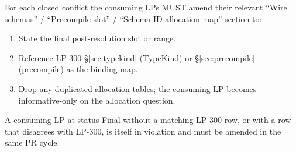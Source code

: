 For each closed conflict the consuming LPs MUST amend their relevant
``Wire schemas'' / ``Precompile slot'' / ``Schema-ID allocation map''
section to:

\begin{enumerate}[leftmargin=2em,nosep]
\item State the final post-resolution slot or range.
\item Reference LP-300 \S\ref{sec:typekind} (TypeKind) or
  \S\ref{sec:precompile} (precompile) as the binding map.
\item Drop any duplicated allocation tables; the consuming LP becomes
  informative-only on the allocation question.
\end{enumerate}

A consuming LP at status Final without a matching LP-300 row, or with
a row that disagrees with LP-300, is itself in violation and must be
amended in the same PR cycle.
